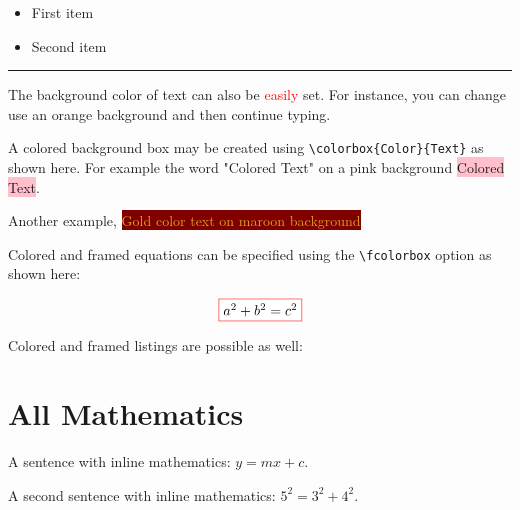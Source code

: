 \documentclass[12]{article}
\begin{document}
    \begin{itemize}
    \color{ForestGreen}
    \item First item
    \item Second item
    \end{itemize}

    \noindent
    {\color{RubineRed} \rule{\linewidth}{0.5mm}}

    The background color of text can also be \textcolor{red}{easily} set. For instance, you can change use an \colorbox{BurntOrange}{orange background} and then continue typing.

    A colored background box may be created using \verb|\colorbox{Color}{Text}| as shown here.
    For example the word "Colored Text" on a pink background \colorbox{pink}{Colored Text}.

    Another example, \colorbox{Maroon}{\textcolor{Goldenrod}{Gold color text on maroon background}}


    Colored and framed equations can be specified using the \verb|\fcolorbox| option as shown here:

    \[
    \fcolorbox{red}{white}{$a^{2} + b^{2} = c^{2}$}
    \]

    Colored and framed listings are possible as well:




    \section{All Mathematics}%
    \label{sec:All Mathematics}

    A sentence with inline mathematics: $y = mx + c$.

    A second sentence with inline mathematics: $5^{2}=3^{2}+4^{2}$.
\end{document}
